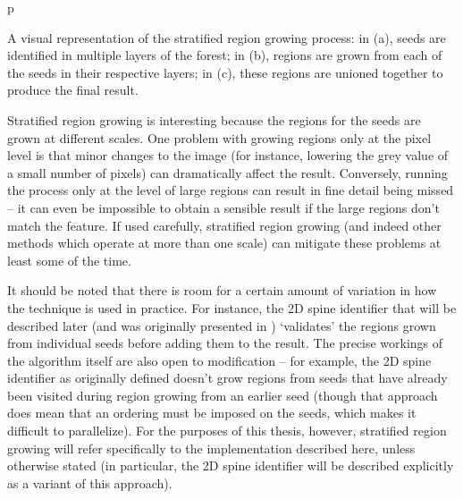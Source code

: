 \begin{stusubfig}{p}
	\\
\caption[A visual representation of the stratified region growing process]{A visual representation of the stratified region growing process: in (a), seeds are identified in multiple layers of the forest; in (b), regions are grown from each of the seeds in their respective layers; in (c), these regions are unioned together to produce the final result.}
\label{fig:featureid-techniques-stratifiedregiongrowing}
\end{stusubfig}

Stratified region growing is interesting because the regions for the seeds are grown at different scales. One problem with growing regions only at the pixel level is that minor changes to the image (for instance, lowering the grey value of a small number of pixels) can dramatically affect the result. Conversely, running the process only at the level of large regions can result in fine detail being missed -- it can even be impossible to obtain a sensible result if the large regions don't match the feature. If used carefully, stratified region growing (and indeed other methods which operate at more than one scale) can mitigate these problems at least some of the time.

It should be noted that there is room for a certain amount of variation in how the technique is used in practice. For instance, the 2D spine identifier that will be described later (and was originally presented in \cite{gvcispa09}) `validates' the regions grown from individual seeds before adding them to the result. The precise workings of the algorithm itself are also open to modification -- for example, the 2D spine identifier as originally defined doesn't grow regions from seeds that have already been visited during region growing from an earlier seed (though that approach does mean that an ordering must be imposed on the seeds, which makes it difficult to parallelize). For the purposes of this thesis, however, stratified region growing will refer specifically to the implementation described here, unless otherwise stated (in particular, the 2D spine identifier will be described explicitly as a variant of this approach).

